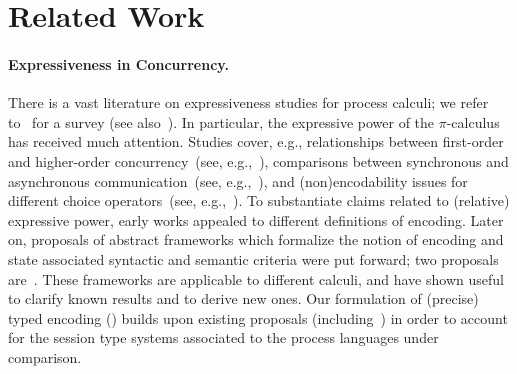 \section{Related Work}
\label{sec:related}

\paragraph{Expressiveness in Concurrency.}
There is a vast literature on expressiveness studies for process calculi;
we refer to~\cite{DBLP:journals/entcs/Parrow08} for a survey
(see also~\cite[\S\,2.3]{PerezPhD10}). 
In particular, the expressive power of the $\pi$-calculus has received much attention.
Studies cover, e.g., 
relationships between first-order and higher-order concurrency~(see, e.g.,~\cite{San923,San96int}),
comparisons between 
synchronous and asynchronous communication~(see, e.g.,~\cite{Boudol92,Palamidessi03,BeauxisPV08}),
and
(non)encodability issues for different choice operators~(see, e.g.,~\cite{Nestmann00,DBLP:conf/esop/PetersNG13}).
To substantiate claims related to (relative) expressive power,
early works appealed to different definitions of encoding.
Later on, 
proposals of abstract 
frameworks which formalize the notion of encoding 
and state associated syntactic and semantic criteria 
were put forward; 
two proposals are~\cite{DBLP:journals/iandc/Gorla10,DBLP:journals/tcs/FuL10}. 
These frameworks are applicable to different calculi, and 
have shown useful to clarify known results and to derive new ones.
Our formulation of (precise) typed encoding () 
builds upon existing proposals (including~\cite{Palamidessi03,DBLP:journals/iandc/Gorla10,DBLP:conf/icalp/LanesePSS10})
in order to account for the session type systems
associated to the process languages under comparison.


